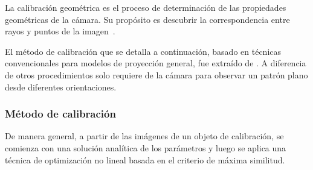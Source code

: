 \begin{definition}
	La calibración geométrica es el proceso de determinación de las propiedades geométricas de la cámara. Su propósito es descubrir la correspondencia entre rayos y puntos de la imagen~\cite{kannala2008geometric}.
\end{definition}

El método de calibración que se detalla a continuación, basado en técnicas convencionales para modelos de proyección general, fue extraído de \cite{zhang2000flexible}. A diferencia de otros procedimientos solo requiere de la cámara para observar un patrón plano desde diferentes orientaciones.

\subsubsection{Método de calibración}

De manera general, a partir de las imágenes de un objeto de calibración, se comienza con una solución analítica de los parámetros y luego se aplica una técnica de optimización no lineal basada en el criterio de máxima similitud.


